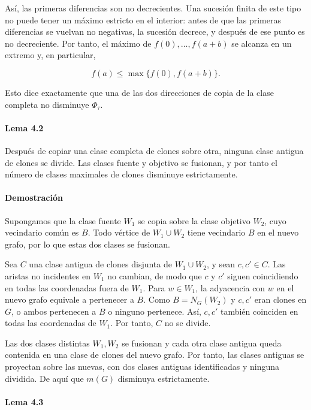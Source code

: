 \documentclass[
  spanish,
  11pt,
  a4paper,
]{article}
\begin{document}
Así, las primeras diferencias son no decrecientes. Una sucesión finita de este tipo no puede tener un máximo estricto en el interior: antes de que las primeras diferencias se vuelvan no negativas, la sucesión decrece, y después de ese punto es no decreciente. Por tanto, el máximo de \(f(0),\ldots,f(a+b)\) se alcanza en un extremo y, en particular,

\[
f(a)\le\max\{f(0),f(a+b)\}.
\]

Esto dice exactamente que una de las dos direcciones de copia de la clase completa no disminuye \(\Phi_\tau\).

\paragraph{Lema 4.2}\label{lema-4.2}

Después de copiar una clase completa de clones sobre otra, ninguna clase antigua de clones se divide. Las clases fuente y objetivo se fusionan, y por tanto el número de clases maximales de clones disminuye estrictamente.

\paragraph{Demostración}\label{demostraciuxf3n-3}

Supongamos que la clase fuente \(W_1\) se copia sobre la clase objetivo \(W_2\), cuyo vecindario común es \(B\). Todo vértice de \(W_1\cup W_2\) tiene vecindario \(B\) en el nuevo grafo, por lo que estas dos clases se fusionan.

Sea \(C\) una clase antigua de clones disjunta de \(W_1\cup W_2\), y sean \(c,c'\in C\). Las aristas no incidentes en \(W_1\) no cambian, de modo que \(c\) y \(c'\) siguen coincidiendo en todas las coordenadas fuera de \(W_1\). Para \(w\in W_1\), la adyacencia con \(w\) en el nuevo grafo equivale a pertenecer a \(B\). Como \(B=N_G(W_2)\) y \(c,c'\) eran clones en \(G\), o ambos pertenecen a \(B\) o ninguno pertenece. Así, \(c,c'\) también coinciden en todas las coordenadas de \(W_1\). Por tanto, \(C\) no se divide.

Las dos clases distintas \(W_1,W_2\) se fusionan y cada otra clase antigua queda contenida en una clase de clones del nuevo grafo. Por tanto, las clases antiguas se proyectan sobre las nuevas, con dos clases antiguas identificadas y ninguna dividida. De aquí que \(m(G)\) disminuya estrictamente.

\paragraph{Lema 4.3}\label{lema-4.3}
\end{document}
